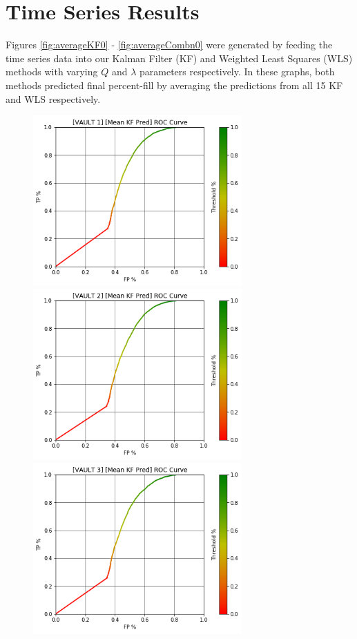\pagebreak

\section{Time Series Results}

Figures \ref{fig:averageKF0} - \ref{fig:averageCombn0} were generated by feeding the time series data into our Kalman Filter (KF) and Weighted Least Squares (WLS) methods with varying $Q$ and $\lambda$ parameters respectively. In these graphs, both methods predicted final percent-fill by averaging the predictions from all 15 KF and WLS respectively.

\begin{figure}[h]
\centering
\includegraphics[width=8cm]{body/results/Graphs/JustSeries/1.PerformaceofMean/1.KF/Raw/v1.png}
\includegraphics[width=8cm]{body/results/Graphs/JustSeries/1.PerformaceofMean/1.KF/Raw/v2.png}
\includegraphics[width=8cm]{body/results/Graphs/JustSeries/1.PerformaceofMean/1.KF/Raw/v3.png}

\end{figure}
